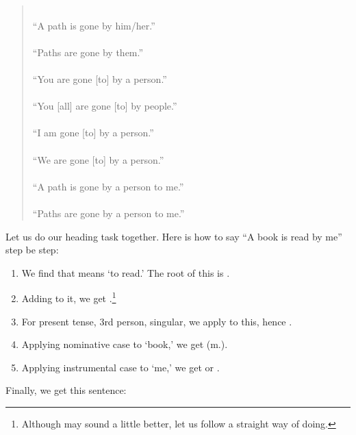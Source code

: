 \begin{quote}
\\
``A path is gone by him/her.''\\[1.5mm]
\\
``Paths are gone by them.''\\[1.5mm]
\\
``You are gone [to] by a person.''\\[1.5mm]
\\
``You [all] are gone [to] by people.''\\[1.5mm]
\\
``I am gone [to] by a person.''\\[1.5mm]
\\
``We are gone [to] by a person.''\\[1.5mm]
\\
``A path is gone by a person to me.''\\[1.5mm]
\\
``Paths are gone by a person to me.''\\[1.5mm]
\end{quote}

Let us do our heading task together. Here is how to say ``A book is read by me'' step be step:
\begin{enumerate}
\item We find  that means `to read.' The root of this is .
\item Adding  to it, we get .\footnote{Although  may sound a little better, let us follow a straight way of doing.}
\item For present tense, 3rd person, singular, we apply  to this, hence .
\item Applying nominative case to `book,' we get  (m.).
\item Applying instrumental case to `me,' we get  or .
\end{enumerate}

Finally, we get this sentence:


